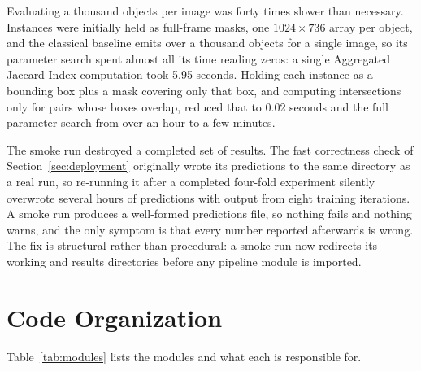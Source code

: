 Evaluating a thousand objects per image was forty times slower than
necessary. Instances were initially held as full-frame masks, one
$1024 \times 736$ array per object, and the classical baseline emits over a
thousand objects for a single image, so its parameter search spent almost all
its time reading zeros: a single Aggregated Jaccard Index computation took 5.95
seconds. Holding each instance as a bounding box plus a mask covering only that
box, and computing intersections only for pairs whose boxes overlap, reduced that
to 0.02 seconds and the full parameter search from over an hour to a few minutes.

The smoke run destroyed a completed set of results. The fast correctness
check of Section~\ref{sec:deployment} originally wrote its predictions to the same
directory as a real run, so re-running it after a completed four-fold experiment
silently overwrote several hours of predictions with output from eight training
iterations. A smoke run produces a well-formed predictions file, so nothing fails
and nothing warns, and the only symptom is that every number reported afterwards
is wrong. The fix is structural rather than procedural: a smoke run now redirects
its working and results directories before any pipeline module is imported.

\section{Code Organization}

Table~\ref{tab:modules} lists the modules and what each is responsible for.

